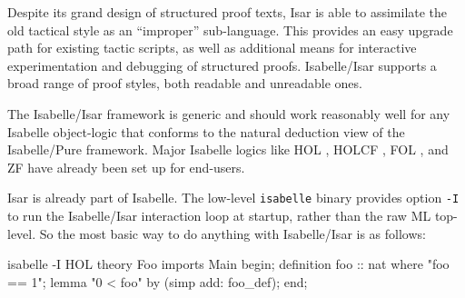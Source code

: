 \begin{isabellebody}
\begin{isamarkuptext}
  Despite its grand design of structured proof texts, Isar is able to
  assimilate the old tactical style as an ``improper'' sub-language.
  This provides an easy upgrade path for existing tactic scripts, as
  well as additional means for interactive experimentation and
  debugging of structured proofs.  Isabelle/Isar supports a broad
  range of proof styles, both readable and unreadable ones.

  \medskip The Isabelle/Isar framework is generic and should work
  reasonably well for any Isabelle object-logic that conforms to the
  natural deduction view of the Isabelle/Pure framework.  Major
  Isabelle logics like HOL \cite{isabelle-HOL}, HOLCF
  \cite{MuellerNvOS99}, FOL \cite{isabelle-logics}, and ZF
  \cite{isabelle-ZF} have already been set up for end-users.%
\end{isamarkuptext}%
\isamarkuptrue%
%
\isamarkuptrue%
%
\isamarkuptrue%
%
\begin{isamarkuptext}%
Isar is already part of Isabelle.  The low-level \verb|isabelle| binary provides option \verb|-I| to run the
  Isabelle/Isar interaction loop at startup, rather than the raw ML
  top-level.  So the most basic way to do anything with Isabelle/Isar
  is as follows:   %
\begin{ttbox}
isabelle -I HOL\medskip
{}\medskip
theory Foo imports Main begin;
definition foo :: nat where "foo == 1";
lemma "0 < foo" by (simp add: foo_def);
end;
\end{ttbox}


\end{isamarkuptext}
\end{isabellebody}
